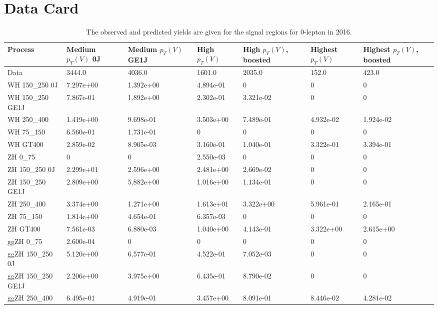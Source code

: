 \chapter{Data Card} \label{app:datacard}

\begin{table}
\centering
\caption[2016 0-lepton signal selection yields]{
                  The observed and predicted yields are given for the
                  signal regions for 0-lepton in 2016.
                  }
{\footnotesize
\begin{tabularx}{\textwidth}{|X|X|X|X|X|X|X|}
\hline
Process & Medium $p_{T}(V)$ 0J & Medium $p_{T}(V)$ GE1J & High $p_{T}(V)$ & High $p_{T}(V)$, boosted & Highest $p_{T}(V)$ & Highest $p_{T}(V)$, boosted \\
\hline
Data & 3444.0 & 4036.0 & 1601.0 & 2035.0 & 152.0 & 423.0 \\
\hline
WH 150\_250 0J & 7.297e+00 & 1.392e+00 & 4.894e-01 & 0 & 0 & 0 \\
WH 150\_250 GE1J & 7.867e-01 & 1.892e+00 & 2.302e-01 & 3.321e-02 & 0 & 0 \\
WH 250\_400 & 1.419e+00 & 9.698e-01 & 3.503e+00 & 7.489e-01 & 4.932e-02 & 1.924e-02 \\
WH 75\_150 & 6.560e-01 & 1.731e-01 & 0 & 0 & 0 & 0 \\
WH GT400 & 2.859e-02 & 8.905e-03 & 3.160e-01 & 1.040e-01 & 3.322e-01 & 3.394e-01 \\
ZH 0\_75 & 0 & 0 & 2.550e-03 & 0 & 0 & 0 \\
ZH 150\_250 0J & 2.299e+01 & 2.596e+00 & 2.481e+00 & 2.669e-02 & 0 & 0 \\
ZH 150\_250 GE1J & 2.809e+00 & 5.882e+00 & 1.016e+00 & 1.134e-01 & 0 & 0 \\
ZH 250\_400 & 3.374e+00 & 1.271e+00 & 1.613e+01 & 3.322e+00 & 5.961e-01 & 2.165e-01 \\
ZH 75\_150 & 1.814e+00 & 4.654e-01 & 6.357e-03 & 0 & 0 & 0 \\
ZH GT400 & 7.561e-03 & 6.880e-03 & 1.040e+00 & 4.143e-01 & 3.322e+00 & 2.615e+00 \\
ggZH 0\_75 & 2.600e-04 & 0 & 0 & 0 & 0 & 0 \\
ggZH 150\_250 0J & 5.120e+00 & 6.577e-01 & 4.522e-01 & 7.052e-03 & 0 & 0 \\
ggZH 150\_250 GE1J & 2.206e+00 & 3.975e+00 & 6.435e-01 & 8.790e-02 & 0 & 0 \\
ggZH 250\_400 & 6.495e-01 & 4.919e-01 & 3.457e+00 & 8.091e-01 & 8.446e-02 & 4.281e-02 \\

\end{tabularx}}
\end{table}
